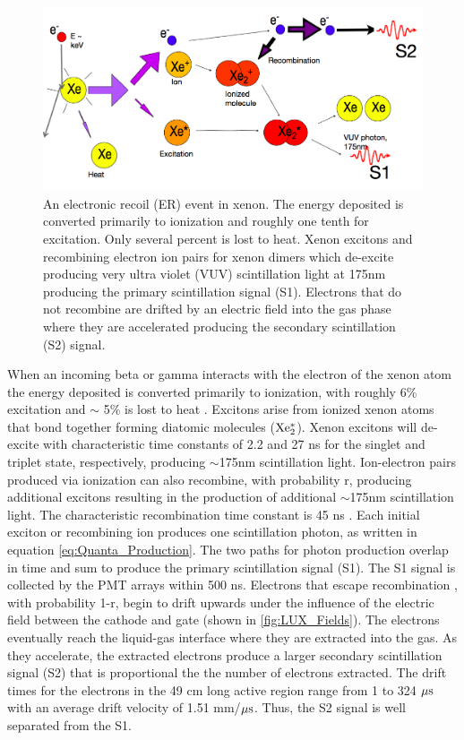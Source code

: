 \renewcommand{\baselinestretch}{1}
\small\normalsize
\begin{figure}[h!]\centering
\includegraphics[width=130mm]{Chapter_LUX_Det/ER_T_Shutt.png}
\caption{An electronic recoil (ER) event in xenon. The energy deposited is converted primarily to ionization and roughly one tenth for excitation. Only several percent is lost to heat. Xenon excitons and recombining electron ion pairs for xenon dimers which de-excite producing very ultra violet  (VUV) scintillation light at 175nm producing the primary scintillation signal (S1). Electrons that do not recombine are drifted by an electric field into the gas phase where they are accelerated producing the secondary scintillation (S2) signal. }
\label{fig:TomS_ER}
\end{figure}
\renewcommand{\baselinestretch}{2}
\small\normalsize


\noindent When an incoming beta or gamma interacts with the electron of the xenon atom the energy deposited is converted primarily to ionization,  with roughly 6\% excitation and $\sim$ 5\% is lost to heat \cite{alpha_xenon} \cite{FanoTheoretical}. Excitons arise from ionized xenon atoms that bond together forming diatomic molecules ($\rm Xe^*_2$). Xenon excitons will de-excite with characteristic time constants of 2.2 and 27 ns for the singlet and triplet state, respectively, producing $\sim$175nm scintillation light. Ion-electron pairs produced via ionization can also recombine, with probability r, producing additional excitons resulting in the production of additional $\sim$175nm scintillation light. The characteristic recombination time constant is 45 ns \cite{Xe_Recombination_Time}. Each initial exciton or recombining ion produces one scintillation photon, as written in equation \ref{eq:Quanta_Production}. The two paths for photon production overlap in time and sum to produce the primary scintillation signal (S1). The S1 signal is collected by the PMT arrays within 500 ns. Electrons that escape recombination , with probability 1-r, begin to drift upwards under the influence of the electric field between the cathode and gate (shown in \ref{fig:LUX_Fields}). The electrons eventually reach the liquid-gas interface where they are extracted into the gas. As they accelerate, the extracted electrons produce a larger secondary scintillation signal (S2) that is proportional the the number of electrons extracted. The drift times for the electrons in the 49 cm long active region range from 1 to 324 $\rm \mu s$ with an average drift velocity of 1.51 mm/$\rm \mu s$. Thus, the S2 signal is well separated from the S1. 



